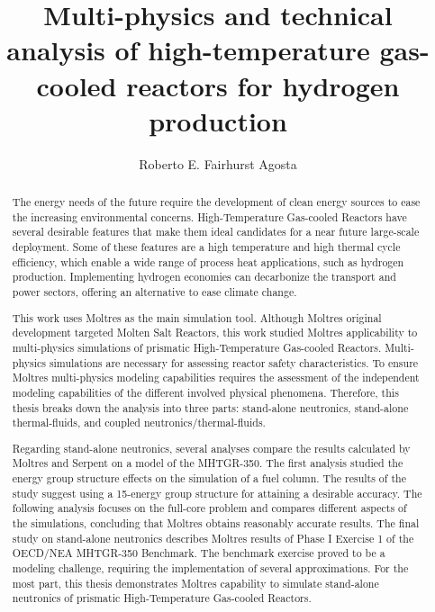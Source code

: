 \documentclass[edeposit,fullpage]{uiucthesis2018}
\title{Multi-physics and technical analysis of high-temperature gas-cooled reactors for hydrogen production}
\author{Roberto E. Fairhurst Agosta}
\begin{document}
\maketitle

\frontmatter
\begin{abstract}

The energy needs of the future require the development of clean energy sources to ease the increasing environmental concerns.
High-Temperature Gas-cooled Reactors have several desirable features that make them ideal candidates for a near future large-scale deployment.
Some of these features are a high temperature and high thermal cycle efficiency, which enable a wide range of process heat applications, such as hydrogen production.
Implementing hydrogen economies can decarbonize the transport and power sectors, offering an alternative to ease climate change.

This work uses Moltres as the main simulation tool.
Although Moltres original development targeted Molten Salt Reactors, this work studied Moltres applicability to multi-physics simulations of prismatic High-Temperature Gas-cooled Reactors.
Multi-physics simulations are necessary for assessing reactor safety characteristics.
To ensure Moltres multi-physics modeling capabilities requires the assessment of the independent modeling capabilities of the different involved physical phenomena.
Therefore, this thesis breaks down the analysis into three parts: stand-alone neutronics, stand-alone thermal-fluids, and coupled neutronics/thermal-fluids.

Regarding stand-alone neutronics, several analyses compare the results calculated by Moltres and Serpent on a model of the MHTGR-350.
The first analysis studied the energy group structure effects on the simulation of a fuel column.
The results of the study suggest using a 15-energy group structure for attaining a desirable accuracy.
The following analysis focuses on the full-core problem and compares different aspects of the simulations, concluding that Moltres obtains reasonably accurate results.
The final study on stand-alone neutronics describes Moltres results of Phase I Exercise 1 of the OECD/NEA MHTGR-350 Benchmark.
The benchmark exercise proved to be a modeling challenge, requiring the implementation of several approximations.
For the most part, this thesis demonstrates Moltres capability to simulate stand-alone neutronics of prismatic High-Temperature Gas-cooled Reactors.


\end{abstract}
\end{document}
